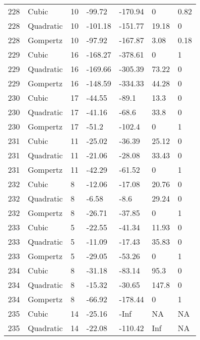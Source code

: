 \documentclass[11pt]{article}
\begin{document}
\begin{center}
\begin{longtable}{lllllll}
    228 & Cubic     & 10              & -99.72  & -170.94 & 0       & 0.82 \\
    228 & Quadratic & 10              & -101.18 & -151.77 & 19.18   & 0    \\
    228 & Gompertz  & 10              & -97.92  & -167.87 & 3.08    & 0.18 \\
    229 & Cubic     & 16              & -168.27 & -378.61 & 0       & 1    \\
    229 & Quadratic & 16              & -169.66 & -305.39 & 73.22   & 0    \\
    229 & Gompertz  & 16              & -148.59 & -334.33 & 44.28   & 0    \\
    230 & Cubic     & 17              & -44.55  & -89.1   & 13.3    & 0    \\
    230 & Quadratic & 17              & -41.16  & -68.6   & 33.8    & 0    \\
    230 & Gompertz  & 17              & -51.2   & -102.4  & 0       & 1    \\
    231 & Cubic     & 11              & -25.02  & -36.39  & 25.12   & 0    \\
    231 & Quadratic & 11              & -21.06  & -28.08  & 33.43   & 0    \\
    231 & Gompertz  & 11              & -42.29  & -61.52  & 0       & 1    \\
    232 & Cubic     & 8               & -12.06  & -17.08  & 20.76   & 0    \\
    232 & Quadratic & 8               & -6.58   & -8.6    & 29.24   & 0    \\
    232 & Gompertz  & 8               & -26.71  & -37.85  & 0       & 1    \\
    233 & Cubic     & 5               & -22.55  & -41.34  & 11.93   & 0    \\
    233 & Quadratic & 5               & -11.09  & -17.43  & 35.83   & 0    \\
    233 & Gompertz  & 5               & -29.05  & -53.26  & 0       & 1    \\
    234 & Cubic     & 8               & -31.18  & -83.14  & 95.3    & 0    \\
    234 & Quadratic & 8               & -15.32  & -30.65  & 147.8   & 0    \\
    234 & Gompertz  & 8               & -66.92  & -178.44 & 0       & 1    \\
    235 & Cubic     & 14              & -25.16  & -Inf    & NA      & NA   \\
    235 & Quadratic & 14              & -22.08  & -110.42 & Inf     & NA   \\

\end{longtable}
\end{center}
\end{document}
